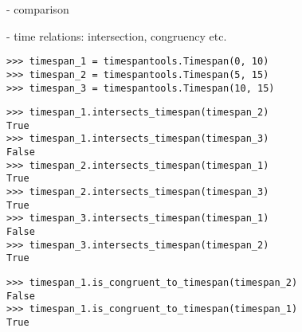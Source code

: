 - comparison

- time relations: intersection, congruency etc.

\begin{comment}
<abjad>
timespan_1 = timespantools.Timespan(0, 10)
timespan_2 = timespantools.Timespan(5, 15)
timespan_3 = timespantools.Timespan(10, 15)
</abjad>
\end{comment}

\begin{singlespacing}
\begin{lstlisting}
>>> timespan_1 = timespantools.Timespan(0, 10)
>>> timespan_2 = timespantools.Timespan(5, 15)
>>> timespan_3 = timespantools.Timespan(10, 15)
\end{lstlisting}
\end{singlespacing}

\begin{comment}
<abjad>
timespan_1.intersects_timespan(timespan_2)
timespan_1.intersects_timespan(timespan_3)
timespan_2.intersects_timespan(timespan_1)
timespan_2.intersects_timespan(timespan_3)
timespan_3.intersects_timespan(timespan_1)
timespan_3.intersects_timespan(timespan_2)
</abjad>
\end{comment}

\begin{singlespacing}
\begin{lstlisting}
>>> timespan_1.intersects_timespan(timespan_2)
True
>>> timespan_1.intersects_timespan(timespan_3)
False
>>> timespan_2.intersects_timespan(timespan_1)
True
>>> timespan_2.intersects_timespan(timespan_3)
True
>>> timespan_3.intersects_timespan(timespan_1)
False
>>> timespan_3.intersects_timespan(timespan_2)
True
\end{lstlisting}
\end{singlespacing}

\begin{comment}
<abjad>
timespan_1.is_congruent_to_timespan(timespan_2)
timespan_1.is_congruent_to_timespan(timespan_1)
</abjad>
\end{comment}

\begin{singlespacing}
\begin{lstlisting}
>>> timespan_1.is_congruent_to_timespan(timespan_2)
False
>>> timespan_1.is_congruent_to_timespan(timespan_1)
True
\end{lstlisting}
\end{singlespacing}

